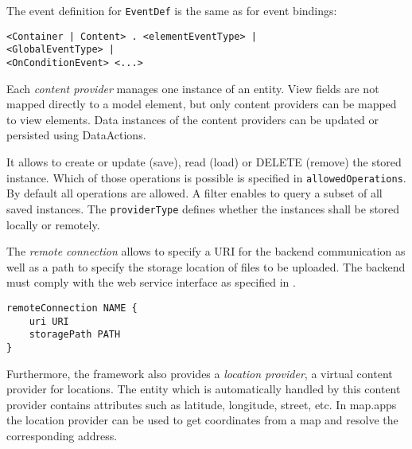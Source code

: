 The event definition for \lstinline!EventDef! is the same as for event bindings:
\begin{lstlisting}
<Container | Content> . <elementEventType> |
<GlobalEventType> |
<OnConditionEvent> <...>
\end{lstlisting}

Each \textit{content provider} manages one instance of an entity. View fields are not mapped directly to a model element, but only content providers can be mapped to view elements. Data instances of the content providers can be updated or persisted using DataActions.

It allows to create or update (save), read (load) or DELETE (remove) the stored instance. Which of those operations is possible is specified in \lstinline!allowedOperations!. By default all operations are allowed. A filter enables to query a subset of all saved instances. The \lstinline!providerType! defines whether the instances shall be stored locally or remotely.

The \textit{remote connection} allows to specify a URI for the backend communication as well as a path to specify the storage location of files to be uploaded. The backend must comply with the \MD web service interface as specified in .
\begin{lstlisting}
remoteConnection NAME {
	uri URI
	storagePath PATH
}
\end{lstlisting}

Furthermore, the \MD framework also provides a \textit{location provider}, \ie a virtual content provider for locations. The entity which is automatically handled by this content provider contains attributes such as latitude, longitude, street, etc. In map.apps the location provider can be used to get coordinates from a map and resolve the corresponding address.
